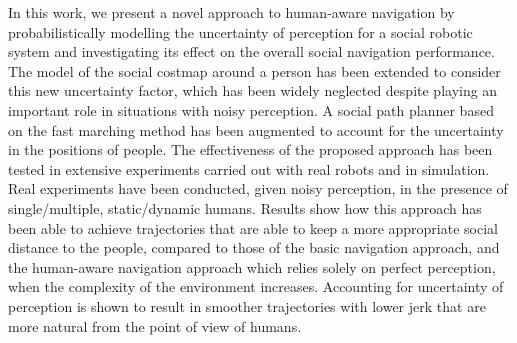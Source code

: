 In this work, we present a novel approach to human-aware navigation by probabilistically modelling the uncertainty of perception for a social robotic system and investigating its effect on the overall social navigation performance. The %
model of the social costmap around a person has been extended to consider this new uncertainty factor, which has been widely neglected despite playing an important role in situations with noisy perception. A social path planner based on the fast marching method has been augmented to account for the uncertainty in the positions of people.
The effectiveness of the proposed approach has been tested in extensive experiments carried out with real robots and in simulation. Real experiments have been conducted, given noisy perception, in the presence of single/multiple, static/dynamic humans. Results show how this approach has been able to achieve trajectories that are able to keep a more appropriate social distance to the people, compared to those of the basic navigation approach, and the human-aware navigation approach which relies solely on perfect perception, when the complexity of the environment increases. 
Accounting for uncertainty of perception is shown to result in smoother trajectories with lower jerk that are more natural from the point of view of humans. 



